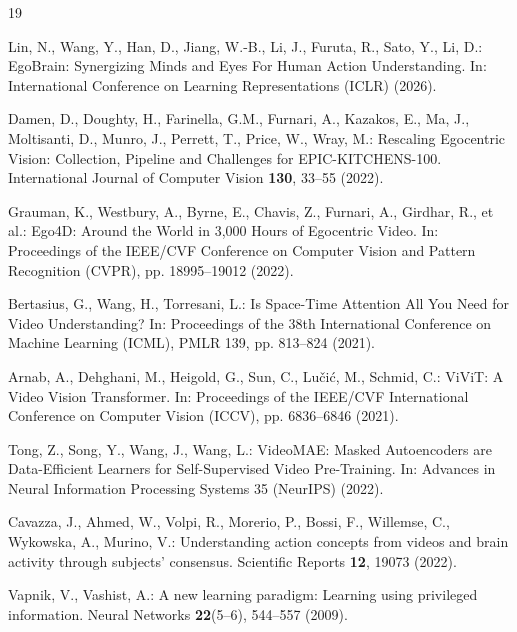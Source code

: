 \documentclass[runningheads]{llncs}
\begin{document}
\begin{thebibliography}{19}

Lin, N., Wang, Y., Han, D., Jiang, W.-B., Li, J., Furuta, R., Sato, Y., Li, D.:
EgoBrain: Synergizing Minds and Eyes For Human Action Understanding.
In: International Conference on Learning Representations (ICLR) (2026).

Damen, D., Doughty, H., Farinella, G.M., Furnari, A., Kazakos, E., Ma, J., Moltisanti, D., Munro, J., Perrett, T., Price, W., Wray, M.:
Rescaling Egocentric Vision: Collection, Pipeline and Challenges for EPIC-KITCHENS-100.
International Journal of Computer Vision \textbf{130}, 33--55 (2022).

Grauman, K., Westbury, A., Byrne, E., Chavis, Z., Furnari, A., Girdhar, R., et al.:
Ego4D: Around the World in 3,000 Hours of Egocentric Video.
In: Proceedings of the IEEE/CVF Conference on Computer Vision and Pattern Recognition (CVPR), pp. 18995--19012 (2022).

Bertasius, G., Wang, H., Torresani, L.:
Is Space-Time Attention All You Need for Video Understanding?
In: Proceedings of the 38th International Conference on Machine Learning (ICML), PMLR 139, pp. 813--824 (2021).

Arnab, A., Dehghani, M., Heigold, G., Sun, C., Lu\v{c}i\'c, M., Schmid, C.:
ViViT: A Video Vision Transformer.
In: Proceedings of the IEEE/CVF International Conference on Computer Vision (ICCV), pp. 6836--6846 (2021).

Tong, Z., Song, Y., Wang, J., Wang, L.:
VideoMAE: Masked Autoencoders are Data-Efficient Learners for Self-Supervised Video Pre-Training.
In: Advances in Neural Information Processing Systems 35 (NeurIPS) (2022).

Cavazza, J., Ahmed, W., Volpi, R., Morerio, P., Bossi, F., Willemse, C., Wykowska, A., Murino, V.:
Understanding action concepts from videos and brain activity through subjects' consensus.
Scientific Reports \textbf{12}, 19073 (2022).

Vapnik, V., Vashist, A.:
A new learning paradigm: Learning using privileged information.
Neural Networks \textbf{22}(5--6), 544--557 (2009).


\end{thebibliography}
\end{document}
